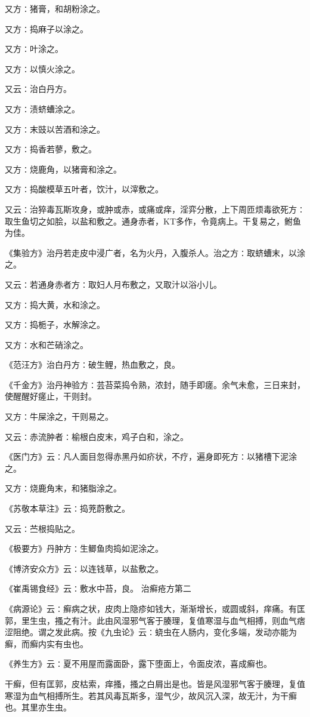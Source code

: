 \documentclass[a4paper,12pt,UTF8,twoside]{ctexbook}
\begin{document}
又方∶猪膏，和胡粉涂之。

又方∶捣麻子以涂之。

又方∶叶涂之。

又方∶以慎火涂之。

又云∶治白丹方。

又方∶渍蛴螬涂之。

又方∶末豉以苦酒和涂之。

又方∶捣香若蓼，敷之。

又方∶烧鹿角，以猪膏和涂之。

又方∶捣酸模草五叶者，饮汁，以滓敷之。

又云∶治猝毒瓦斯攻身，或肿或赤，或痛或痒，淫弈分散，上下周匝烦毒欲死方∶取生鱼切之如脍，以盐和敷之。通身赤者，KT多作，令竟病上。干复易之，鲋鱼为佳。

《集验方》治丹若走皮中浸广者，名为火丹，入腹杀人。治之方∶取蛴螬末，以涂之。

又云∶若通身赤者方∶取妇人月布敷之，又取汁以浴小儿。

又方∶捣大黄，水和涂之。

又方∶捣栀子，水解涂之。

又方∶水和芒硝涂之。

《范汪方》治白丹方∶破生鲤，热血敷之，良。

《千金方》治丹神验方∶芸苔菜捣令熟，浓封，随手即瘥。余气未愈，三日来封，使醒醒好瘥止，干则封。

又方∶牛屎涂之，干则易之。

又云∶赤流肿者∶榆根白皮末，鸡子白和，涂之。

《医门方》云∶凡人面目忽得赤黑丹如疥状，不疗，遍身即死方∶以猪槽下泥涂之。

又方∶烧鹿角末，和猪脂涂之。

《苏敬本草注》云∶捣茺蔚敷之。

又云∶苎根捣贴之。

《极要方》丹肿方∶生鲫鱼肉捣如泥涂之。

《博济安众方》云∶以连钱草，以盐敷之。

《崔禹锡食经》云∶敷水中苔，良。
治癣疮方第二

《病源论》云∶癣病之状，皮肉上隐疹如钱大，渐渐增长，或圆或斜，痒痛。有匡郭，里生虫，搔之有汁。此由风湿邪气客于腠理，复值寒湿与血气相搏，则血气痞涩阻绝。谓之发此病。按《九虫论》云∶蛲虫在人肠内，变化多端，发动亦能为癣，而癣内实有虫也。

《养生方》云∶夏不用屋而露面卧，露下堕面上，令面皮浓，喜成癣也。

干癣，但有匡郭，皮枯索，痒搔，搔之白屑出是也。皆是风湿邪气客于腠理，复值寒湿为血气相搏所生。若其风毒瓦斯多，湿气少，故风沉入深，故无汁，为干癣也。其里亦生虫。
\end{document}
